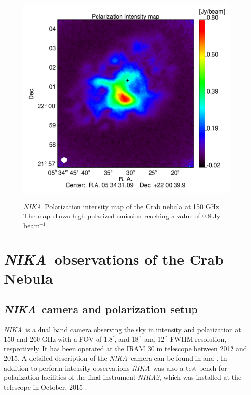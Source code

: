 \documentclass[twocolumn,traditabstract]{aa}
\def\NIKA{\textit{NIKA}}
\def\NIKAd{\textit{NIKA2}}
\begin{document}
 \begin{figure}
  \centering
     	   {\includegraphics[width=0.75\linewidth,keepaspectratio]{figures/Crab_ipol2_2mm.pdf}}
\caption{\NIKA\ Polarization intensity map of the  Crab nebula at 150 GHz. The map shows high polarized emission reaching a value of 0.8 Jy beam$^{-1}$.}
\label{crab_ipol_maps}		
  \end{figure}
 

\section{\NIKA\ observations of the Crab Nebula}\label{sec:NIKA observations}
\subsection{\NIKA\ camera and polarization setup}\label{sec:nika camera}
\NIKA\ is a dual band camera observing the sky in intensity and polarization at 150 and 260 GHz with a FOV of 1.8$^{\prime}$, and 18$^{\prime\prime}$ and 12$^{\prime\prime}$ FWHM resolution, respectively. It has been operated at the IRAM 30 m telescope between 2012 and 2015. A detailed description of the \NIKA\ camera can be found in \citet{monfardini2010, monfardini2011} and \citet{catalano2014}. In addition to perform intensity observations \NIKA\ was also a test bench for polarization facilities of the final instrument \NIKAd, which was installed at the telescope in October, 2015 \citep{calvo2016,2016arXiv160508628C}.
\end{document}
